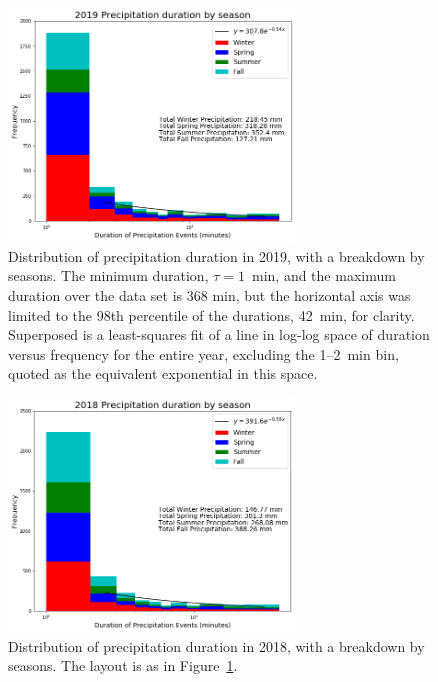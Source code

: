 \documentclass[11pt]{report}
\begin{document}
\begin{figure}[t]
  \centering
  \includegraphics[width=0.675\textwidth]{Figures/More_detail_precip_2019.png}
  \caption[Precipitation histogram for 2019 broken down by
    season]{\label{p2019} Distribution of precipitation duration in
    2019, with a breakdown by seasons. The minimum duration,
    $\tau=1$~min, and the maximum duration over the data set is 368
    min, but the horizontal axis was limited to the 98th percentile of
    the durations, 42~min, for clarity. Superposed is a least-squares
    fit of a line in log-log space of duration versus frequency for
    the entire year, excluding the 1--2~min bin, quoted as the
    equivalent exponential in this space.}
\end{figure}
\begin{figure}[b]
  \centering
  \includegraphics[width=0.675\textwidth]{Figures/precip_2018.png}
  \caption[Precipitation histogram for 2018 broken down by season]{\label{p2018}
    Distribution of precipitation duration in 2018, with a breakdown
    by seasons. The layout is as in Figure~\ref{p2019}.}
\end{figure}
	
\end{document}
